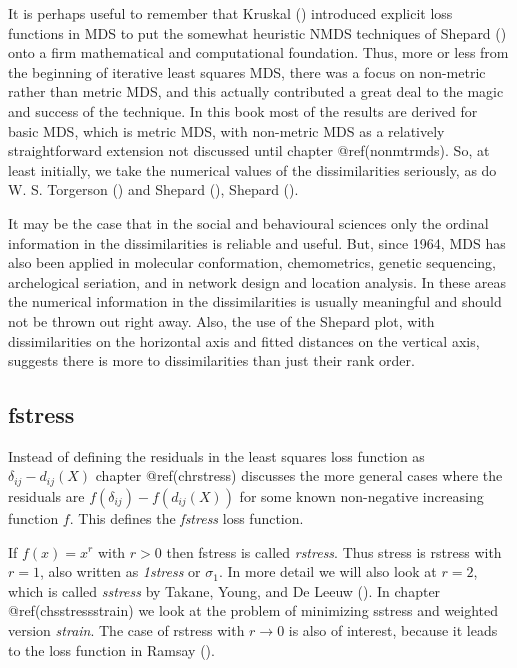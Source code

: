 \documentclass[
  12pt,
  letterpaper,
  DIV=11,
  numbers=noendperiod]{scrreprt}
\theoremstyle{remark}
\begin{document}
It is perhaps useful to remember that Kruskal
() introduced explicit loss functions
in MDS to put the somewhat heuristic NMDS techniques of Shepard
() onto a firm mathematical and
computational foundation. Thus, more or less from the beginning of
iterative least squares MDS, there was a focus on non-metric rather than
metric MDS, and this actually contributed a great deal to the magic and
success of the technique. In this book most of the results are derived
for basic MDS, which is metric MDS, with non-metric MDS as a relatively
straightforward extension not discussed until chapter @ref(nonmtrmds).
So, at least initially, we take the numerical values of the
dissimilarities seriously, as do W. S. Torgerson
() and Shepard
(), Shepard
().

It may be the case that in the social and behavioural sciences only the
ordinal information in the dissimilarities is reliable and useful. But,
since 1964, MDS has also been applied in molecular conformation,
chemometrics, genetic sequencing, archelogical seriation, and in network
design and location analysis. In these areas the numerical information
in the dissimilarities is usually meaningful and should not be thrown
out right away. Also, the use of the Shepard plot, with dissimilarities
on the horizontal axis and fitted distances on the vertical axis,
suggests there is more to dissimilarities than just their rank order.

\subsection{fstress}\label{genfstress}

Instead of defining the residuals in the least squares loss function as
\(\delta_{ij}-d_{ij}(X)\) chapter @ref(chrstress) discusses the more
general cases where the residuals are \(f(\delta_{ij})-f(d_{ij}(X))\)
for some known non-negative increasing function \(f\). This defines the
\emph{fstress} loss function.

If \(f(x)=x^r\) with \(r>0\) then fstress is called \emph{rstress}. Thus
stress is rstress with \(r=1\), also written as \emph{1stress} or
\(\sigma_1\). In more detail we will also look at \(r=2\), which is
called \emph{sstress} by Takane, Young, and De Leeuw
(). In chapter
@ref(chsstressstrain) we look at the problem of minimizing sstress and
weighted version \emph{strain}. The case of rstress with
\(r\rightarrow 0\) is also of interest, because it leads to the loss
function in Ramsay ().
\end{document}
